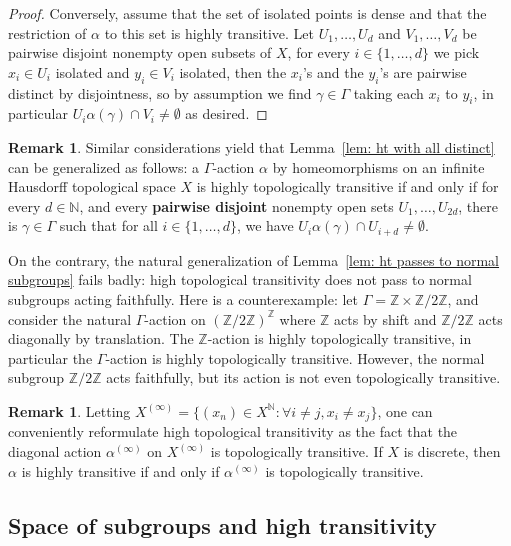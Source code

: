 \documentclass[12pt]{article}
\numberwithin{equation}{section}
\theoremstyle{definition}
\newtheorem{remark}[equation]{Remark}
\def\defin#1{\textbf{#1}}
\newcommand{\N}{\mathbb{N}}
\newcommand{\Z}{\mathbb{Z}}
\begin{document}
\begin{proof}
	Conversely, assume that the set of isolated points is dense and that the 
	restriction of \( \alpha \) to this set is highly transitive. 
	Let \(U_1,\dots,U_d\) and \(V_1,\dots,V_d\) be pairwise disjoint nonempty open subsets of \(X\), 
	for every \( i\in \{1,\dots,d\} \)
	we pick \(x_i\in U_i\) isolated and \(y_i\in V_i\) isolated, then the \(x_i\)'s and the \(y_i\)'s are 
	pairwise distinct by disjointness, so by assumption we find \( \gamma\in\Gamma \) taking each
	\(x_i\) to \(y_i\), in particular \( U_i\alpha(\gamma) \cap V_i\neq \emptyset \) as desired.
\end{proof}


\begin{remark}\label{rmk: disjoint version for htt}
	Similar considerations yield that Lemma~\ref{lem: ht with all distinct} can be generalized as follows:
	a \( \Gamma \)-action \( \alpha \) by homeomorphisms on an infinite Hausdorff topological space \(X\) is highly topologically transitive if and only if 
	for every \( d\in\N \), and every \defin{pairwise disjoint} nonempty open sets \( U_1,\dots,U_{2d} \),
	there is \( \gamma\in\Gamma \) such that for all \( i\in \{1,\dots,d\} \), 
	we have \( U_i\alpha(\gamma)\cap U_{i+d}\neq\emptyset \). 

	On the contrary, the natural generalization of Lemma~\ref{lem: ht passes to normal subgroups} fails badly:
	high topological transitivity does not pass to normal subgroups acting faithfully. Here is a counterexample:
	let \( \Gamma=\Z\times\Z/2\Z \), and consider the natural \( \Gamma \)-action on \( (\Z/2\Z)^{\Z} \) where 
	\( \Z \) acts by shift and \( \Z/2\Z \) acts diagonally by translation. 
	The \( \Z \)-action is  highly topologically transitive, in particular the \(\Gamma\)-action
	is highly topologically transitive. 
	However, the normal subgroup \( \Z/2\Z \) acts faithfully,
	but its action is not even topologically transitive. 
\end{remark}

\begin{remark}
    Letting \( X^{(\infty)}=\{(x_n)\in X^\N\colon\forall i\neq j, x_i\neq x_j \} \), 
    one can conveniently reformulate high topological transitivity as the fact that the 
    diagonal action \(\alpha^{(\infty)}\) on \( X^{(\infty)} \) is topologically
    transitive. 
    If $X$ is discrete, then $\alpha$ is highly transitive if and only if \(\alpha^{(\infty)}\) is topologically     transitive.
\end{remark}

\subsection{Space of subgroups and high transitivity}
\end{document}
